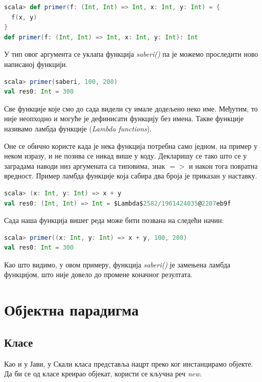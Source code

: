 \documentclass[12pt,oneside]{memoir}
\begin{document}
\begin{lstlisting}[language=Scala]
scala> def primer(f: (Int, Int) => Int, x: Int, y: Int) = {
  f(x, y)
}
def primer(f: (Int, Int) => Int, x: Int, y: Int): Int
\end{lstlisting}

У тип овог аргумента се уклапа функција \textit{saberi()} па је можемо проследити ново написаној функцији.

\begin{lstlisting}[language=Scala]
scala> primer(saberi, 100, 200)
val res0: Int = 300
\end{lstlisting}

Све функције које смо до сада видели су имале додељено неко име. Међутим, то није неопходно и могуће је дефинисати функцију без имена. Такве функције називамо ламбда функције (\textit{Lambda functions}).

Оне се обично користе када је нека функција потребна само једном, на пример у неком изразу, и не позива се никад више у коду. Декларишу се тако што се у заградама наводи низ аргумената са типовима, знак $=>$ и након тога повратна вредност. Пример ламбда функције која сабира два броја је приказан у наставку.

\begin{lstlisting}[language=Scala]
scala> (x: Int, y: Int) => x + y
val res0: (Int, Int) => Int = $Lambda$2582/1961424035@2207eb9f
\end{lstlisting}

Сада наша функција вишег реда може бити позвана на следећи начин:

\begin{lstlisting}[language=Scala]
scala> primer((x: Int, y: Int) => x + y, 100, 200)
val res0: Int = 300
\end{lstlisting}

Као што видимо, у овом примеру, функција \textit{saberi()} је замењена ламбда функцијом, што није довело до промене коначног резултата. 

\section{Објектна парадигма}
\label{sec:scala_oop}

\subsection{Класе}
\label{subsec:scala_klase}

Као и у Јави, у Скали класа представља нацрт преко ког инстанцирамо објекте. Да би се од класе креирао објекат, користи се кључна реч \textit{new}.
\end{document}
